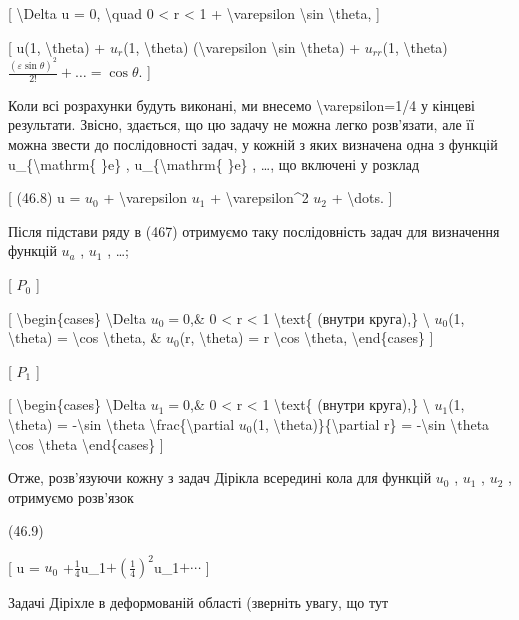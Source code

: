 \documentclass[
]{article}
\begin{document}
{{{{[} \textbackslash Delta u = 0, \textbackslash quad 0 \textless{} r
\textless{} 1 + \textbackslash varepsilon \textbackslash sin
\textbackslash theta, {]}

{[} u(1, \textbackslash theta) + \(u_r\)(1, \textbackslash theta)
(\textbackslash varepsilon \textbackslash sin \textbackslash theta) +
\(u_{rr}\)(1,
\textbackslash theta)\(\frac{(\varepsilon \sin \theta)^2}{2!} + \dots = \cos \theta\).
{]}

Коли всі розрахунки будуть виконані, ми внесемо
\textbackslash varepsilon=1/4 у кінцеві результати. Звісно, здається, що
цю задачу не можна легко розв'язати, але її можна звести до
послідовності задач, у кожній з яких визначена одна з функцій
u\_\{\textbackslash mathrm\{ \}e\} , u\_\{\textbackslash mathrm\{ \}e\}
, \ldots, що включені у розклад

{[} (46.8) u = \(u_0\) + \textbackslash varepsilon \(u_1\) +
\textbackslash varepsilon\^{}2 \(u_2\) + \textbackslash dots. {]}

Після підстави ряду в (467) отримуємо таку послідовність задач для
визначення функцій \(u_a\) , \(u_1\) , \ldots;

{[} \(P_{0}\) {]}

{[} \textbackslash begin\{cases\} \textbackslash Delta \(u_{0} = 0\),\&
0 \textless{} r \textless{} 1 \textbackslash text\{ (внутри круга),\}
\textbackslash{} \(u_{0}\)(1, \textbackslash theta) = \textbackslash cos
\textbackslash theta, \& \(u_{0}\)(r, \textbackslash theta) = r
\textbackslash cos \textbackslash theta, \textbackslash end\{cases\} {]}

{[} \(P_{1}\) {]}

{[} \textbackslash begin\{cases\} \textbackslash Delta \(u_{1} = 0\),\&
0 \textless{} r \textless{} 1 \textbackslash text\{ (внутри круга),\}
\textbackslash{} \(u_{1}\)(1, \textbackslash theta) =
-\textbackslash sin \textbackslash theta
\textbackslash frac\{\textbackslash partial \(u_{0}\)(1,
\textbackslash theta)\}\{\textbackslash partial r\} =
-\textbackslash sin \textbackslash theta \textbackslash cos
\textbackslash theta \textbackslash end\{cases\} {]}

Отже, розв'язуючи кожну з задач Дірікла всередині кола для функцій
\(u_0\) , \(u_1\) , \(u_2\) , отримуємо розв'язок

(46.9)

{[} u = \(u_0\)
+\(\frac{1}{4}\)u\_1\(+ \left(\frac{1}{4}\right)^2\)u\_1\(+ \cdots\) {]}

Задачі Діріхле в деформованій області (зверніть увагу, що тут

}}}
\end{document}
